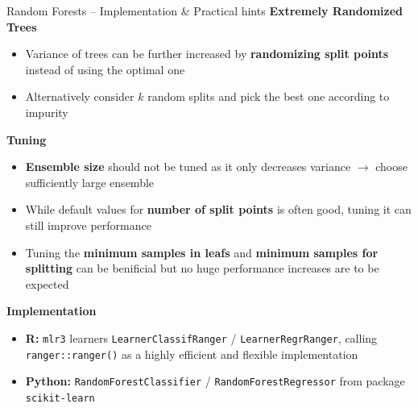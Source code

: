 \documentclass[11pt,compress,t,notes=noshow, xcolor=table]{beamer}
\newcommand{\highlight}[1]{\textcolor{hlcol}{\textbf{#1}}}
\begin{document}
\begin{frame2}{Random Forests -- Implementation \& Practical hints}
  \highlight{Extremely Randomized Trees}
\begin{itemize}
    \item Variance of trees can be further increased by \textbf{randomizing split points} instead of using the optimal one
    \item Alternatively consider $k$ random splits and pick the best one according to impurity 
\end{itemize}

\medskip

\highlight{Tuning} 
\begin{itemize}
    \item \textbf{Ensemble size} should not be tuned as it only decreases variance $\longrightarrow$ choose sufficiently large ensemble
    \item While default values for \textbf{number of split points} is often good, tuning it can still improve performance
    \item Tuning the \textbf{minimum samples in leafs} and \textbf{minimum samples for splitting} can be benificial but no huge performance increases are to be expected 
\end{itemize}

\medskip

\highlight{Implementation}

\begin{itemize}
  \item \textbf{R:} \texttt{mlr3} learners \texttt{LearnerClassifRanger} / 
    \texttt{LearnerRegrRanger}, calling \texttt{ranger::ranger()} as a highly efficient and flexible implementation
  \item \textbf{Python:} \texttt{RandomForestClassifier} / 
  \texttt{RandomForestRegressor} from package \texttt{scikit-learn}
\end{itemize}
\end{frame2}
\end{document}
